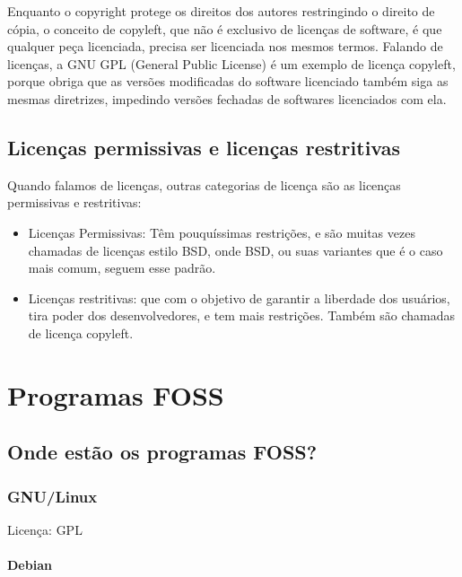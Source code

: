 \documentclass[12pt, a4paper]{report}
\begin{document}
Enquanto o copyright protege os direitos dos autores restringindo o direito de cópia, o conceito de copyleft, que não é exclusivo de licenças de software, é que qualquer peça licenciada, precisa ser licenciada nos mesmos termos. Falando de licenças, a GNU GPL (General Public License) é um exemplo de licença copyleft, porque obriga que as versões modificadas do software licenciado também siga as mesmas diretrizes, impedindo versões fechadas de softwares licenciados com ela.

\section{Licenças permissivas e licenças restritivas}


Quando falamos de licenças, outras categorias de licença são as licenças permissivas e restritivas:

\begin{itemize}

\item Licenças Permissivas: Têm pouquíssimas restrições, e são muitas vezes chamadas de licenças estilo BSD, onde BSD, ou suas variantes que é o caso mais comum, seguem esse padrão.

\item Licenças restritivas: que com o objetivo de garantir a liberdade dos usuários, tira poder dos desenvolvedores, e tem mais restrições. Também são chamadas de licença copyleft.

\end{itemize}

\chapter{Programas FOSS}

\section{Onde estão os programas FOSS?}

\subsection{GNU/Linux}

Licença: GPL

\subsubsection{Debian}
\end{document}
